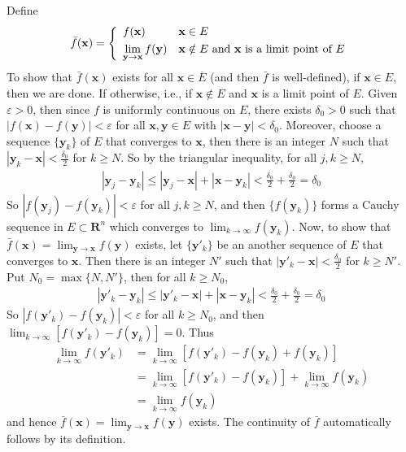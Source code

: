 \documentclass[12pt]{article}
\theoremstyle{definition}
\begin{document}
Define 
\begin{align*}
\bar{f}(\mathbf{x})
=\left\{\begin{array}{ll}
f(\mathbf{x})&\mathbf{x}\in E\vspace{0.05in}\\
\displaystyle\lim_{\mathbf{y}\to\mathbf{x}}f(\mathbf{y})&\mbox{$\mathbf{x}\notin E$ and $\mathbf{x}$ is a limit point of $E$}
\end{array}\right.
\end{align*}
To show that $\bar{f}(\mathbf{x})$ exists for all $\mathbf{x}\in\overline{E}$ (and then $\bar{f}$ is well-defined), if $\mathbf{x}\in E$, then we are done. If otherwise, i.e., if $\mathbf{x}\notin E$ and $\mathbf{x}$ is a limit point of $E$. Given $\varepsilon>0$, then since $f$ is uniformly continuous on $E$, there exists $\delta_0>0$ such that $\left\vert f(\mathbf{x})-f(\mathbf{y})\right\vert<\varepsilon$ for all $\mathbf{x},\mathbf{y}\in E$ with $\left\vert\mathbf{x}-\mathbf{y}\right\vert<\delta_0$. Moreover, choose a sequence $\{\mathbf{y}_k\}$ of $E$ that converges to $\mathbf{x}$, then there is an integer $N$ such that $\left\vert\mathbf{y}_k-\mathbf{x}\right\vert<\frac{\delta_0}{2}$ for $k\ge N$. So by the triangular inequality, for all $j,k\ge N$,
\begin{align*}
\left\vert \mathbf{y}_j-\mathbf{y}_k\right\vert
\le\left\vert \mathbf{y}_j-\mathbf{x}\right\vert+\left\vert \mathbf{x}-\mathbf{y}_k\right\vert
<\frac{\delta_0}{2}+\frac{\delta_0}{2}
=\delta_0
\end{align*}
So $\left\vert f(\mathbf{y}_j)-f(\mathbf{y}_k)\right\vert<\varepsilon$ for all $j,k\ge N$, and then $\{f(\mathbf{y}_k)\}$ forms a Cauchy sequence in $E\subset\mathbf{R}^n$ which converges to $\lim_{k\to\infty}f(\mathbf{y}_k)$. Now, to show that $\bar{f}(\mathbf{x})=\lim_{\mathbf{y}\to\mathbf{x}}f(\mathbf{y})$ exists, let $\{\mathbf{y}'_k\}$ be an another sequence of $E$ that converges to $\mathbf{x}$. Then there is an integer $N'$ such that $\left\vert\mathbf{y}'_k-\mathbf{x}\right\vert<\frac{\delta_0}{2}$ for $k\ge N'$. Put $N_0=\max\{N,N'\}$, then for all $k\ge N_0$,
\begin{align*}
\left\vert\mathbf{y}'_k-\mathbf{y}_k\right\vert
\le\left\vert \mathbf{y}'_k-\mathbf{x}\right\vert+\left\vert \mathbf{x}-\mathbf{y}_k\right\vert
<\frac{\delta_0}{2}+\frac{\delta_0}{2}
=\delta_0
\end{align*}
So $\left\vert f(\mathbf{y}'_k)-f(\mathbf{y}_k)\right\vert<\varepsilon$ for all $k\ge N_0$, and then $\lim_{k\to\infty}\left[f(\mathbf{y}'_k)-f(\mathbf{y}_k)\right]=0$. Thus
\begin{align*}
\lim_{k\to\infty}f(\mathbf{y}'_k)
&=\lim_{k\to\infty}\left[f(\mathbf{y}'_k)-f(\mathbf{y}_k)+f(\mathbf{y}_k)\right] \\
&=\lim_{k\to\infty}\left[f(\mathbf{y}'_k)-f(\mathbf{y}_k)\right]+\lim_{k\to\infty}f(\mathbf{y}_k) \\
&=\lim_{k\to\infty}f(\mathbf{y}_k)
\end{align*}
and hence $\bar{f}(\mathbf{x})=\lim_{\mathbf{y}\to\mathbf{x}}f(\mathbf{y})$ exists. The continuity of $\bar{f}$ automatically follows by its definition.
\end{document}

